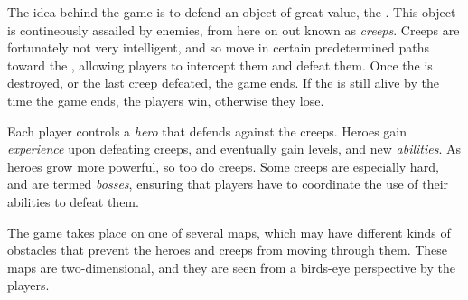 The idea behind the game is to defend an object of great value, the \objective.
This object is contineously assailed by enemies, from here on out known as \emph{creeps}.
Creeps are fortunately not very intelligent, and so move in certain predetermined
paths toward the \objective, allowing players to intercept them and defeat them.
Once the \objective is destroyed, or the last creep defeated, the game ends. If
the \objective is still alive by the time the game ends, the players win, otherwise
they lose.

Each player controls a \emph{hero} that defends against the creeps. Heroes gain
\emph{experience} upon defeating creeps, and eventually gain levels, and new \emph{abilities}.
As heroes grow more powerful, so too do creeps. Some creeps are especially hard, and
are termed \emph{bosses}, ensuring that players have to coordinate the use of their
abilities to defeat them.

The game takes place on one of several maps, which may have different kinds of
obstacles that prevent the heroes and creeps from moving through them. These
maps are two-dimensional, and they are seen from a birds-eye perspective by
the players.
